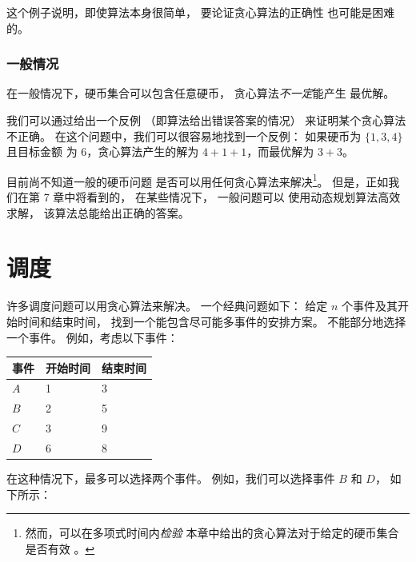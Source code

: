 这个例子说明，即使算法本身很简单，
要论证贪心算法的正确性
也可能是困难的。

\subsubsection{一般情况}

在一般情况下，硬币集合可以包含任意硬币，
贪心算法\emph{不一定}能产生
最优解。

我们可以通过给出一个反例
（即算法给出错误答案的情况）
来证明某个贪心算法不正确。
在这个问题中，我们可以很容易地找到一个反例：
如果硬币为 $\{1,3,4\}$ 且目标金额
为 6，贪心算法产生的解为
$4+1+1$，而最优解为 $3+3$。

目前尚不知道一般的硬币问题
是否可以用任何贪心算法来解决\footnote{然而，可以在多项式时间内\emph{检验}
本章中给出的贪心算法对于给定的硬币集合是否有效 \cite{pea05}。}。
但是，正如我们在第 7 章中将看到的，
在某些情况下，
一般问题可以
使用动态规划算法高效求解，
该算法总能给出正确的答案。

\section{调度}

许多调度问题可以用贪心算法来解决。
一个经典问题如下：
给定 $n$ 个事件及其开始时间和结束时间，
找到一个能包含尽可能多事件的安排方案。
不能部分地选择一个事件。
例如，考虑以下事件：
\begin{center}
\begin{tabular}{lll}
事件 & 开始时间 & 结束时间 \\
\hline
$A$ & 1 & 3 \\
$B$ & 2 & 5 \\
$C$ & 3 & 9 \\
$D$ & 6 & 8 \\
\end{tabular}
\end{center}
在这种情况下，最多可以选择两个事件。
例如，我们可以选择事件 $B$ 和 $D$，
如下所示：
\begin{center}
\end{center}

